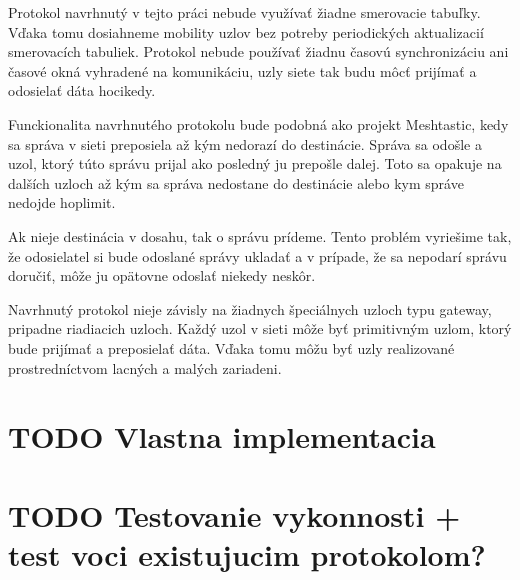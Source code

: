\documentclass[slovak,master]{diploma}
\begin{document}
Protokol navrhnutý v tejto práci nebude využívať žiadne smerovacie tabuľky. Vďaka tomu dosiahneme mobility uzlov bez potreby 
periodických aktualizacií smerovacích tabuliek. Protokol nebude používať žiadnu časovú synchronizáciu ani časové okná vyhradené na komunikáciu, 
uzly siete tak budu môcť prijímať a odosielať dáta hocikedy.

Funckionalita navrhnutého protokolu bude podobná ako projekt Meshtastic, kedy sa správa v sieti preposiela až kým nedorazí do destinácie.
Správa sa odošle a uzol, ktorý túto správu prijal ako posledný ju prepošle dalej. Toto sa opakuje na dalších uzloch až kým sa správa nedostane do destinácie alebo kym správe nedojde hoplimit.

Ak nieje destinácia v dosahu, tak o správu prídeme. Tento problém vyriešime tak, že odosielatel si bude odoslané správy ukladať a v prípade, že sa nepodarí správu doručiť, môže ju opätovne 
odoslať niekedy neskôr.

Navrhnutý protokol nieje závisly na žiadnych špeciálnych uzloch typu gateway, pripadne riadiacich uzloch. Každý uzol v sieti môže byť primitivným uzlom, ktorý bude prijímať a preposielať dáta.
Vďaka tomu môžu byť uzly realizované prostredníctvom lacných a malých zariadeni.

\chapter{TODO Vlastna implementacia}
\chapter{TODO Testovanie vykonnosti + test voci existujucim protokolom?}


\printbibliography[title={Literatura}, heading=bibintoc]

%
%

%
\end{document}
